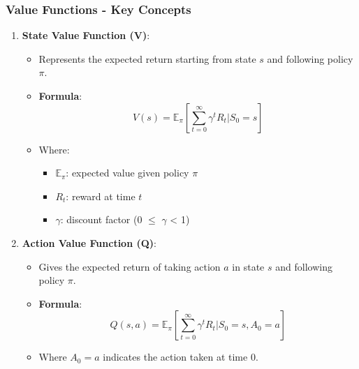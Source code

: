 \documentclass[aspectratio=169]{beamer}
\begin{document}
\begin{frame}[fragile]
    \frametitle{Value Functions - Key Concepts}
    \begin{enumerate}
        \item \textbf{State Value Function (V)}:
        \begin{itemize}
            \item Represents the expected return starting from state \( s \) and following policy \( \pi \).
            \item \textbf{Formula}:
            \begin{equation}
                V(s) = \mathbb{E}_\pi \left[ \sum_{t=0}^{\infty} \gamma^t R_t | S_0 = s \right]
            \end{equation}
            \item Where:
            \begin{itemize}
                \item \( \mathbb{E}_\pi \): expected value given policy \( \pi \)
                \item \( R_t \): reward at time \( t \)
                \item \( \gamma \): discount factor (0 $\leq$ \( \gamma \) < 1)
            \end{itemize}
        \end{itemize}

        \item \textbf{Action Value Function (Q)}:
        \begin{itemize}
            \item Gives the expected return of taking action \( a \) in state \( s \) and following policy \( \pi \).
            \item \textbf{Formula}:
            \begin{equation}
                Q(s, a) = \mathbb{E}_\pi \left[ \sum_{t=0}^{\infty} \gamma^t R_t | S_0 = s, A_0 = a \right]
            \end{equation}
            \item Where \( A_0 = a \) indicates the action taken at time \( 0 \).
        \end{itemize}
    \end{enumerate}
\end{frame}
\end{document}
